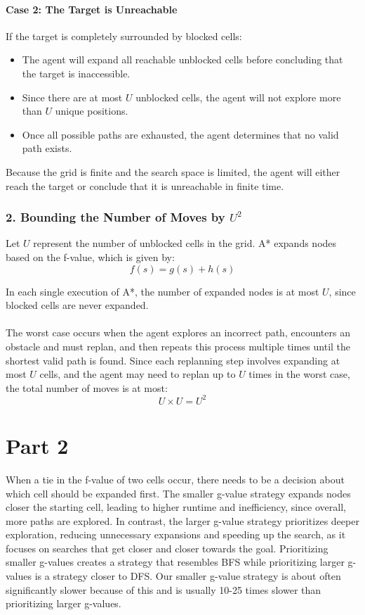 \documentclass{article}
\begin{document}
\paragraph{Case 2: The Target is Unreachable}
If the target is completely surrounded by blocked cells:
\begin{itemize}
    \item The agent will expand all reachable unblocked cells before concluding that the target is inaccessible.
    \item Since there are at most $U$ unblocked cells, the agent will not explore more than $U$ unique positions.
    \item Once all possible paths are exhausted, the agent determines that no valid path exists.
\end{itemize}

Because the grid is finite and the search space is limited, the agent will either reach the target or conclude that it is unreachable in finite time.

\subsubsection*{2. Bounding the Number of Moves by $U^2$}

Let $U$ represent the number of unblocked cells in the grid. A* expands nodes based on the f-value, which is given by:
\[f(s) = g(s) + h(s)\]


In each single execution of A*, the number of expanded nodes is at most $U$, since blocked cells are never expanded.

\paragraph{}
The worst case occurs when the agent explores an incorrect path, encounters an obstacle and must replan, and then repeats this process multiple times until the shortest valid path is found. Since each replanning step involves expanding at most $U$ cells, and the agent may need to replan up to $U$ times in the worst case, the total number of moves is at most:
\[U \times U = U^2\]

\section{Part 2}
When a tie in the f-value of two cells occur, there needs to be a decision about which cell should be expanded first. The smaller g-value strategy expands nodes closer the starting cell, leading to higher runtime and inefficiency, since overall, more paths are explored. In contrast, the larger g-value strategy prioritizes deeper exploration, reducing unnecessary expansions and speeding up the search, as it focuses on searches that get closer and closer towards the goal. Prioritizing smaller g-values creates a strategy that resembles BFS while prioritizing larger g-values is a strategy closer to DFS. Our smaller g-value strategy is about often significantly slower because of this and is usually 10-25 times slower than prioritizing larger g-values.
\end{document}
